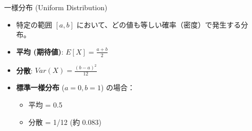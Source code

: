 \documentclass[
  ignorenonframetext,
]{beamer}
\providecommand{\tightlist}{%
  \setlength{\itemsep}{0pt}\setlength{\parskip}{0pt}}
\begin{document}
\begin{frame}{一様分布 (Uniform Distribution)}
\protect\hypertarget{ux4e00ux69d8ux5206ux5e03-uniform-distribution}{}
\begin{itemize}
\tightlist
\item
  特定の範囲 \([a, b]\)
  において、どの値も等しい確率（密度）で発生する分布。
\item
  \textbf{平均 (期待値)}: \(E[X] = \frac{a+b}{2}\)
\item
  \textbf{分散}: \(Var(X) = \frac{(b-a)^2}{12}\)
\item
  \textbf{標準一様分布} (\(a=0, b=1\)) の場合：

  \begin{itemize}
  \tightlist
  \item
    平均 = 0.5
  \item
    分散 = 1/12 (約 0.083)
  \end{itemize}
\end{itemize}
\end{frame}
\end{document}
